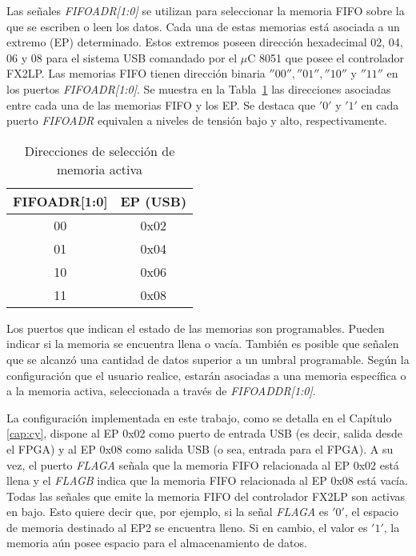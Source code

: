 	
	Las señales \textit{FIFOADR[1:0]} se utilizan para seleccionar la memoria FIFO sobre la que se escriben o leen los datos. Cada una de estas memorias está asociada a un extremo (EP) determinado. Estos extremos poseen dirección hexadecimal 02, 04, 06 y 08 para el sistema USB comandado por el $\mu$C 8051 que posee el controlador FX2LP. Las memorias FIFO tienen dirección binaria $''00'', ''01'', ''10''$ y $''11''$ en los puertos \textit{FIFOADR[1:0]}. Se muestra en la Tabla~\ref{tab:fifoadr} las direcciones asociadas entre cada una de las memorias FIFO y los EP. Se destaca que $'0'$ y $'1'$ en cada puerto \textit{FIFOADR} equivalen a niveles de tensión bajo y alto, respectivamente.
	
	\begin{table}[ht]
		\centering
		\begin{tabular}{cc}
			\hline
			FIFOADR[1:0] & EP (USB)\\
			\hline
			00 & 0x02\\
			01 & 0x04\\
			10 & 0x06\\
			11 & 0x08\\
			\hline
		\end{tabular}
		\caption{Direcciones de selección de memoria activa}
		\label{tab:fifoadr}
	\end{table}
	
	Los puertos que indican el estado de las memorias son programables. Pueden indicar si la memoria se encuentra llena o vacía. También es posible que señalen que se alcanzó una cantidad de datos superior a un umbral programable. Según la configuración que el usuario realice, estarán asociadas a una memoria específica o a la memoria activa, seleccionada a través de \textit{FIFOADDR[1:0]}.
	
	
	La configuración implementada en este trabajo, como se detalla en el Capítulo \ref{cap:cy}, dispone al EP 0x02 como puerto de entrada USB (es decir, salida desde el FPGA) y al EP 0x08 como salida USB (o sea, entrada para el FPGA). A su vez, el puerto \textit{FLAGA} señala que la memoria FIFO relacionada al EP 0x02 está llena y el \textit{FLAGB} indica que la memoria FIFO relacionada al EP 0x08 está vacía. Todas las señales que emite la memoria FIFO del controlador FX2LP son activas en bajo. Esto quiere decir que, por ejemplo, si la señal \textit{FLAGA} es $'0'$, el espacio de memoria destinado al EP2 se encuentra lleno. Si en cambio, el valor es $'1'$, la memoria aún posee espacio para el almacenamiento de datos.
	
